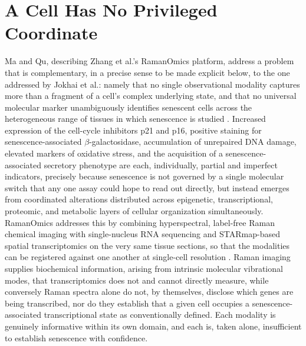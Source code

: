 \documentclass[11pt]{article}
\begin{document}
\section{A Cell Has No Privileged Coordinate}

Ma and Qu, describing Zhang et al.'s RamanOmics platform, address a problem that is complementary, in a precise sense to be made explicit below, to the one addressed by Jokhai et al.: namely that no single observational modality captures more than a fragment of a cell's complex underlying state, and that no universal molecular marker unambiguously identifies senescent cells across the heterogeneous range of tissues in which senescence is studied \cite{zhang2026,maqu2026}. Increased expression of the cell-cycle inhibitors p21 and p16, positive staining for senescence-associated $\beta$-galactosidase, accumulation of unrepaired DNA damage, elevated markers of oxidative stress, and the acquisition of a senescence-associated secretory phenotype are each, individually, partial and imperfect indicators, precisely because senescence is not governed by a single molecular switch that any one assay could hope to read out directly, but instead emerges from coordinated alterations distributed across epigenetic, transcriptional, proteomic, and metabolic layers of cellular organization simultaneously. RamanOmics addresses this by combining hyperspectral, label-free Raman chemical imaging with single-nucleus RNA sequencing and STARmap-based spatial transcriptomics on the very same tissue sections, so that the modalities can be registered against one another at single-cell resolution \cite{zhang2026}. Raman imaging supplies biochemical information, arising from intrinsic molecular vibrational modes, that transcriptomics does not and cannot directly measure, while conversely Raman spectra alone do not, by themselves, disclose which genes are being transcribed, nor do they establish that a given cell occupies a senescence-associated transcriptional state as conventionally defined. Each modality is genuinely informative within its own domain, and each is, taken alone, insufficient to establish senescence with confidence.
\end{document}
